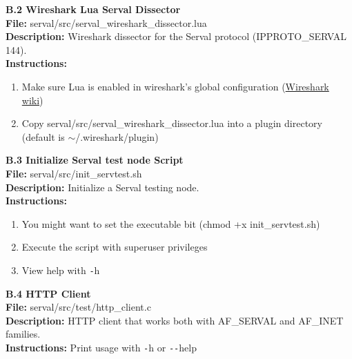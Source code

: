 \newpage
{}
{}
{\huge \bf \noindent B.2 Wireshark Lua Serval Dissector}\\[0.5cm]
\textbf{File:} serval/src/serval\_wireshark\_dissector.lua\\
\textbf{Description:} Wireshark dissector for the Serval protocol (IPPROTO\_SERVAL 144).\\
\textbf{Instructions: }
\begin{enumerate} \itemsep1pt \parskip0pt 
	\item Make sure Lua is enabled in wireshark's global configuration (\href{http://wiki.wireshark.org/Lua}{Wireshark wiki})
	\item Copy serval/src/serval\_wireshark\_dissector.lua into a plugin directory (default is $\sim$/.wireshark/plugin)\\[0.5cm]
\end{enumerate}


\newpage
{}
{}
{\huge \bf \noindent B.3 Initialize Serval test node Script}\\[0.5cm]
\textbf{File:} serval/src/init\_servtest.sh\\
\textbf{Description:} Initialize a Serval testing node.\\
\textbf{Instructions: }
\begin{enumerate} \itemsep1pt \parskip0pt 
	\item You might want to set the executable bit (chmod +x init\_servtest.sh)
	\item Execute the script with superuser privileges
	\item View help with \texttt{-}h\\[0.5cm]
\end{enumerate}


\newpage
{}
{}
{\huge \bf \noindent B.4 HTTP Client}\\[0.5cm]
\textbf{File:} serval/src/test/http\_client.c\\
\textbf{Description:} HTTP client that works both with AF\_SERVAL and AF\_INET families.\\
\textbf{Instructions: } Print usage with \texttt{-}h or \texttt{{-}{-}}help\\[0.5cm]


